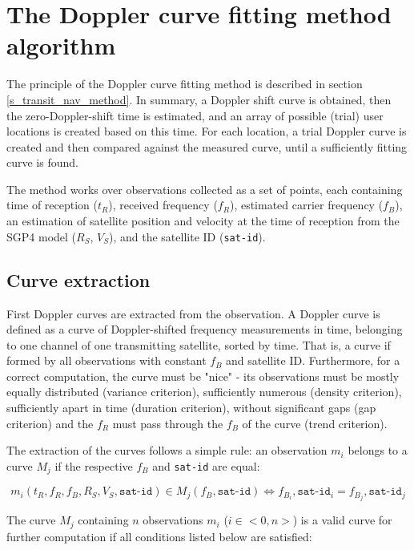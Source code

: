 \section{The Doppler curve fitting method algorithm}
The principle of the Doppler curve fitting method is described in section \ref{s_transit_nav_method}. In summary, a Doppler shift curve is obtained, then the zero-Doppler-shift time is estimated, and an array of possible (trial) user locations is created based on this time. For each location, a trial Doppler curve is created and then compared against the measured curve, until a sufficiently fitting curve is found.

The method works over observations collected as a set of points, each containing time of reception ($t_R$), received frequency ($f_R$), estimated carrier frequency ($f_B$), an estimation of satellite position and velocity at the time of reception from the SGP4 model ($R_S$, $V_S$), and the satellite ID (\texttt{sat-id}).


\subsection{Curve extraction}
First Doppler curves are extracted from the observation. A Doppler curve is defined as a curve of Doppler-shifted frequency measurements in time, belonging to one channel of one transmitting satellite, sorted by time. That is, a curve if formed by all observations with constant $f_B$ and satellite ID. Furthermore, for a correct computation, the curve must be "nice" - its observations must be mostly equally distributed (variance criterion), sufficiently numerous (density criterion), sufficiently apart in time (duration criterion), without significant gaps (gap criterion) and the $f_R$ must pass through the $f_B$ of the curve (trend criterion).

The extraction of the curves follows a simple rule: an observation $m_i$ belongs to a curve $M_j$ if the respective $f_B$ and \texttt{sat-id} are equal:

\begin{equation*}
    m_i(t_R, f_R, f_B, R_S, V_S, \texttt{sat-id}) \in M_j(f_B, \texttt{sat-id}) \Leftrightarrow f_{B_i}, \texttt{sat-id}_i = f_{B_j}, \texttt{sat-id}_j
\end{equation*}

The curve $M_j$ containing $n$ observations $m_i$ ($i \in <0, n>$) is a valid curve for further computation if all conditions listed below are satisfied:

